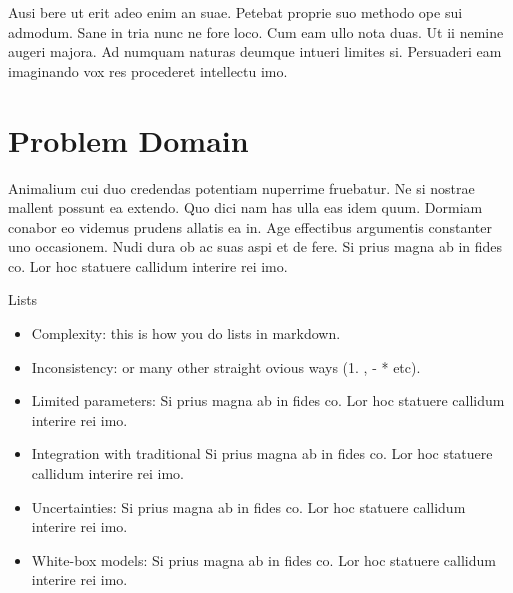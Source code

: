 \documentclass[
  a4paper,
  twoside]{uoe-thesis-template}
\providecommand{\tightlist}{%
  \setlength{\itemsep}{0pt}\setlength{\parskip}{0pt}}\usepackage{longtable,booktabs,array}
\begin{document}
Ausi bere ut erit adeo enim an suae. Petebat proprie suo methodo ope sui
admodum. Sane in tria nunc ne fore loco. Cum eam ullo nota duas. Ut ii
nemine augeri majora. Ad numquam naturas deumque intueri limites si.
Persuaderi eam imaginando vox res procederet intellectu imo.

\section*{Problem Domain}\label{problem-domain}


Animalium cui duo credendas potentiam nuperrime fruebatur. Ne si nostrae
mallent possunt ea extendo. Quo dici nam has ulla eas idem quum. Dormiam
conabor eo videmus prudens allatis ea in. Age effectibus argumentis
constanter uno occasionem. Nudi dura ob ac suas aspi et de fere. Si
prius magna ab in fides co. Lor hoc statuere callidum interire rei imo.

\begin{tcolorbox}[enhanced jigsaw, opacitybacktitle=0.6, colbacktitle=quarto-callout-note-color!10!white, colframe=quarto-callout-note-color-frame, leftrule=.75mm, bottomtitle=1mm, toptitle=1mm, toprule=.15mm, colback=white, left=2mm, titlerule=0mm, opacityback=0, rightrule=.15mm, arc=.35mm, title=\textcolor{quarto-callout-note-color}{\faInfo}\hspace{0.5em}{Note}, bottomrule=.15mm, coltitle=black, breakable]

Lists

\end{tcolorbox}

\begin{itemize}
\tightlist
\item
  Complexity: this is how you do lists in markdown.
\item
  Inconsistency: or many other straight ovious ways (1. , - * etc).
\item
  Limited parameters: Si prius magna ab in fides co. Lor hoc statuere
  callidum interire rei imo.
\item
  Integration with traditional Si prius magna ab in fides co. Lor hoc
  statuere callidum interire rei imo.
\item
  Uncertainties: Si prius magna ab in fides co. Lor hoc statuere
  callidum interire rei imo.
\item
  White-box models: Si prius magna ab in fides co. Lor hoc statuere
  callidum interire rei imo.
\end{itemize}
\end{document}
